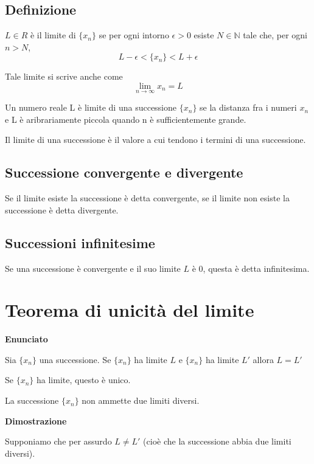 \subsection{Definizione}

$L \in R$ è il limite di $\{x_{n}\}$ se per ogni intorno  $\epsilon > 0$ esiste $N \in \mathbb{N}$ tale che, per ogni $n > N$, $$L - \epsilon < \{x_{n}\} < L + \epsilon$$

Tale limite si scrive anche come $$\lim_{n\to\infty} x_{n} = L$$ 

\begin{tip}
Un numero reale L è limite di una successione $\{x_{n}\}$ se la distanza fra i numeri $x_{n}$ e L è aribrariamente piccola quando n è sufficientemente grande.

Il limite di una successione è il valore a cui tendono i termini di una successione.
\end{tip}

\subsection{Successione convergente e divergente}

Se il limite esiste la successione è detta convergente, se il limite non esiste la successione è detta divergente.

\subsection{Successioni infinitesime }

Se una successione è convergente e il suo limite $L$ è 0, questa è detta infinitesima.

\section{Teorema di unicità del limite}

\textbf{Enunciato}

Sia $\{x_{n}\}$ una successione. Se $\{x_{n}\}$ ha limite $L$ e $\{x_{n}\}$ ha limite $L'$ allora $L=L'$

\begin{tip}
Se $\{x_{n}\}$ ha limite, questo è unico.

La successione $\{x_{n}\}$ non ammette due limiti diversi.
\end{tip}

\textbf{Dimostrazione}

Supponiamo che per assurdo $L \neq L'$ (cioè che la successione abbia due limiti diversi).

